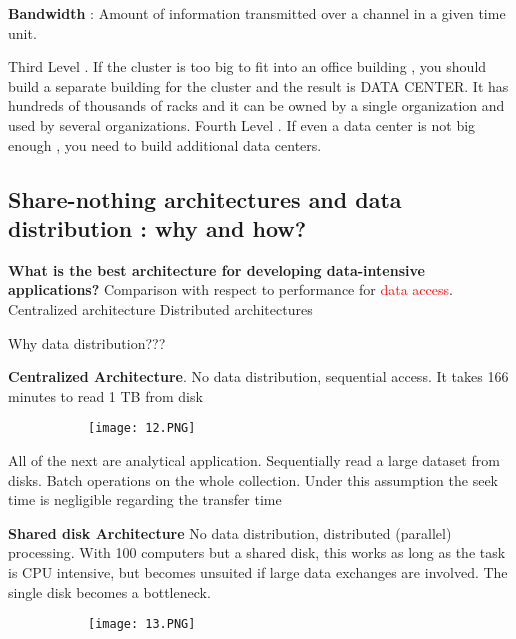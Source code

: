 \documentclass{article}
\begin{document}
\textbf{Bandwidth} : Amount of information transmitted over a channel in a given time unit.

Third Level .
If the cluster is too big to fit into an office building , you should build a separate building for the cluster and the result is DATA CENTER. It has hundreds of thousands of racks and it can be owned by a single organization and used by several organizations.
Fourth Level . If even a data center is not big enough , you need to build additional data centers.

\subsection{Share-nothing architectures and data distribution : why and how?}

\textbf{What is the best architecture for developing data-intensive applications?} Comparison with respect to performance for \textcolor{red}{data access}. 
Centralized architecture 
Distributed architectures 

\vspace{3mm}

Why data distribution???

\textbf{Centralized Architecture}. No data distribution, sequential access. It takes 166 minutes to read 1 TB from disk

\begin{figure}[ht!]
  \centering
  \begin{subfigure}[b]{0.2\linewidth}
    \texttt{[image: 12.PNG]}
  \end{subfigure}
\end{figure}

All of the next are analytical application. Sequentially read a large dataset from disks. Batch operations on the whole collection. Under this assumption the seek time is negligible regarding the transfer time

\textbf{Shared disk Architecture}
No data distribution, distributed (parallel) processing. With 100 computers but a shared disk, this works as long as the task is CPU intensive, but becomes unsuited if large data exchanges are involved. The single disk becomes a bottleneck.

\begin{figure}[ht!]
  \centering
  \begin{subfigure}[b]{0.3\linewidth}
    \texttt{[image: 13.PNG]}
  \end{subfigure}
\end{figure}
\end{document}
